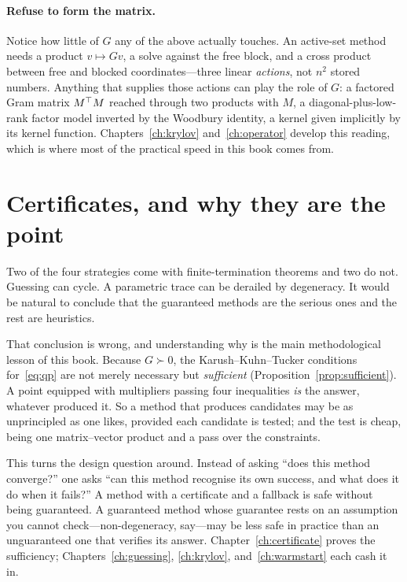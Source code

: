 \paragraph{Refuse to form the matrix.} Notice how little of $G$ any of the above
actually touches. An active-set method needs a product $v \mapsto Gv$, a solve
against the free block, and a cross product between free and blocked
coordinates---three linear \emph{actions}, not $n^2$ stored numbers. Anything
that supplies those actions can play the role of $G$: a factored Gram matrix
$M^{\top} M$ reached through two products with $M$, a diagonal-plus-low-rank factor
model inverted by the Woodbury identity, a kernel given implicitly by its kernel
function. Chapters~\ref{ch:krylov} and~\ref{ch:operator} develop this reading,
which is where most of the practical speed in this book comes from.

\section{Certificates, and why they are the point}

Two of the four strategies come with finite-termination theorems and two do not.
Guessing can cycle. A parametric trace can be derailed by degeneracy. It would be
natural to conclude that the guaranteed methods are the serious ones and the rest
are heuristics.

That conclusion is wrong, and understanding why is the main methodological lesson
of this book. Because $G \succ 0$, the Karush--Kuhn--Tucker conditions
for~\eqref{eq:qp} are not merely necessary but \emph{sufficient}
(Proposition~\ref{prop:sufficient}). A point equipped with multipliers passing
four inequalities \emph{is} the answer, whatever produced it. So a method that
produces candidates may be as unprincipled as one likes, provided each candidate
is tested; and the test is cheap, being one matrix--vector product and a pass over
the constraints.

This turns the design question around. Instead of asking ``does this method
converge?'' one asks ``can this method recognise its own success, and what does it
do when it fails?'' A method with a certificate and a fallback is safe without
being guaranteed. A guaranteed method whose guarantee rests on an assumption you
cannot check---non-degeneracy, say---may be less safe in practice than an
unguaranteed one that verifies its answer. Chapter~\ref{ch:certificate} proves the
sufficiency; Chapters~\ref{ch:guessing}, \ref{ch:krylov}, and~\ref{ch:warmstart}
each cash it in.

